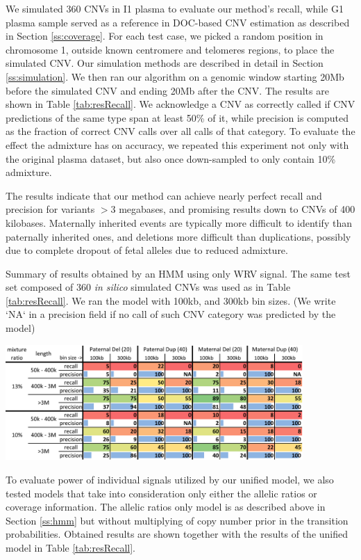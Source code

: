 We simulated 360 CNVs in I1 plasma to evaluate our method's recall, while G1 plasma sample served as a reference in DOC-based CNV estimation as described in Section \ref{ss:coverage}. For each test case, we  picked a random position in chromosome 1, outside known centromere and telomeres regions, to place the simulated CNV.  Our simulation methods are described in detail in Section \ref{ss:simulation}. We then ran our algorithm on a genomic window starting 20Mb before the simulated CNV and ending 20Mb after the CNV. The results are shown in Table \ref{tab:resRecall}. We acknowledge a CNV as correctly called if CNV predictions of the same type span at least 50\% of it, while precision is computed as the fraction of correct CNV calls over all calls of that category. To evaluate the effect the admixture has on accuracy, we repeated this experiment not only with the original plasma dataset, but also once down-sampled to only contain 10\% admixture.

The results indicate that our method can achieve nearly perfect recall and precision for variants ${>3}$ megabases, and promising results down to CNVs of 400 kilobases.  Maternally inherited events are typically more difficult to identify than paternally inherited ones, and deletions more difficult than duplications, possibly due to complete dropout of fetal alleles due to reduced admixture.

\begin{table}
\caption{Summary of results obtained by an HMM using only WRV signal. The same test set composed of 360 \emph{in silico} simulated CNVs was used as in Table \ref{tab:resRecall}. We ran the model with 100kb, and 300kb bin sizes. (We write `NA` in a precision field if no call of such CNV category was predicted by the model)}
\label{tab:resWRV}
\centering
\includegraphics[width=0.85\textwidth]{figures/ismb_wrv_res_color}
\end{table}

To evaluate power of individual signals utilized by our unified model, we also tested models that take into consideration only either the allelic ratios or coverage information. The allelic ratios only model is as described above in Section \ref{ss:hmm} but without multiplying of copy number prior in the transition probabilities. Obtained results are shown together with the results of the unified model in Table \ref{tab:resRecall}. 

